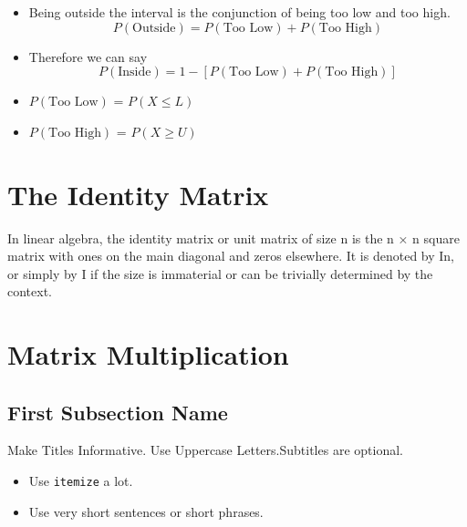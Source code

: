 \begin{itemize}
\begin{frame}
\begin{itemize}
		\item Being outside the interval is the conjunction of being too low and too high.
		\[ P( \mbox{Outside} ) = P( \mbox{Too Low} ) +  P( \mbox{Too High} ) \]
		
		\item Therefore we can say
		\[ P( \mbox{Inside} ) = 1- [P( \mbox{Too Low} ) +  P( \mbox{Too High} )] \]
		\item $P( \mbox{Too Low} )$ = $P( X \leq L)$
		\item $P( \mbox{Too High} )$ = $P( X \geq U)$
	\end{itemize}
\end{frame}

	
	
	
	\section{The Identity Matrix}
	
	In linear algebra, the identity matrix or unit matrix of size n is the n × n square matrix with ones on the main diagonal and zeros elsewhere. It is denoted by In, or simply by I if the size is immaterial or can be trivially determined by the context.
	
	
	
	
	\section{Matrix Multiplication}
	
	\subsection[Short First Subsection Name]{First Subsection Name}
	
	{Make Titles Informative. Use Uppercase Letters.}{Subtitles are optional.}
	
	\begin{itemize}
		\item
		Use \texttt{itemize} a lot.
		\item
		Use very short sentences or short phrases.
	\end{itemize}
	

\end{itemize}
